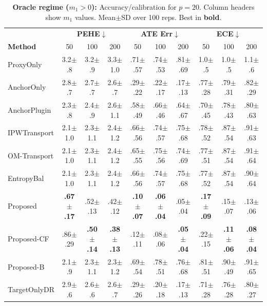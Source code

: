 \begin{table}[t]
\centering
\tiny
\setlength{\tabcolsep}{2pt}
\renewcommand{\arraystretch}{1.1}
\begin{tabular}{@{}l|ccc|ccc|ccc@{}}
\hline
& \multicolumn{3}{c|}{\textbf{PEHE}$\downarrow$} & \multicolumn{3}{c|}{\textbf{ATE Err}$\downarrow$} & \multicolumn{3}{c}{\textbf{ECE}$\downarrow$} \\
\textbf{Method} & 50 & 100 & 200 & 50 & 100 & 200 & 50 & 100 & 200 \\
\hline
ProxyOnly & 3.2{\tiny$\pm$.8} & 3.2{\tiny$\pm$.9} & 3.3{\tiny$\pm$1.0} & .71{\tiny$\pm$.57} & .74{\tiny$\pm$.53} & .81{\tiny$\pm$.69} & 1.0{\tiny$\pm$.5} & 1.0{\tiny$\pm$.5} & 1.1{\tiny$\pm$.6} \\
AnchorOnly & 2.8{\tiny$\pm$.7} & 2.7{\tiny$\pm$.7} & 2.6{\tiny$\pm$.7} & .29{\tiny$\pm$.22} & .22{\tiny$\pm$.17} & .17{\tiny$\pm$.13} & .77{\tiny$\pm$.28} & .79{\tiny$\pm$.31} & .82{\tiny$\pm$.29} \\
AnchorPlugin & 2.3{\tiny$\pm$.8} & 2.4{\tiny$\pm$.9} & 2.6{\tiny$\pm$1.1} & .58{\tiny$\pm$.49} & .66{\tiny$\pm$.46} & .64{\tiny$\pm$.67} & .70{\tiny$\pm$.45} & .78{\tiny$\pm$.43} & .80{\tiny$\pm$.63} \\
IPWTransport & 2.1{\tiny$\pm$1.0} & 2.3{\tiny$\pm$1.1} & 2.4{\tiny$\pm$1.2} & .66{\tiny$\pm$.56} & .74{\tiny$\pm$.57} & .75{\tiny$\pm$.68} & .78{\tiny$\pm$.52} & .87{\tiny$\pm$.54} & .91{\tiny$\pm$.63} \\
OM-Transport & 2.1{\tiny$\pm$1.0} & 2.3{\tiny$\pm$1.1} & 2.4{\tiny$\pm$1.2} & .65{\tiny$\pm$.55} & .75{\tiny$\pm$.56} & .74{\tiny$\pm$.69} & .77{\tiny$\pm$.51} & .87{\tiny$\pm$.54} & .91{\tiny$\pm$.64} \\
EntropyBal & 2.1{\tiny$\pm$1.0} & 2.3{\tiny$\pm$1.1} & 2.4{\tiny$\pm$1.2} & .66{\tiny$\pm$.56} & .74{\tiny$\pm$.57} & .75{\tiny$\pm$.68} & .77{\tiny$\pm$.52} & .87{\tiny$\pm$.54} & .90{\tiny$\pm$.64} \\
Proposed & \textbf{.67{\tiny$\pm$.17}} & .52{\tiny$\pm$.13} & .42{\tiny$\pm$.12} & \textbf{.10{\tiny$\pm$.07}} & \textbf{.06{\tiny$\pm$.04}} & .05{\tiny$\pm$.04} & \textbf{.17{\tiny$\pm$.09}} & .15{\tiny$\pm$.07} & .13{\tiny$\pm$.06} \\
Proposed-CF & .86{\tiny$\pm$.29} & \textbf{.50{\tiny$\pm$.14}} & \textbf{.38{\tiny$\pm$.13}} & .12{\tiny$\pm$.11} & .08{\tiny$\pm$.06} & \textbf{.05{\tiny$\pm$.04}} & .22{\tiny$\pm$.15} & \textbf{.11{\tiny$\pm$.06}} & \textbf{.08{\tiny$\pm$.04}} \\
Proposed-B & 2.1{\tiny$\pm$.9} & 2.3{\tiny$\pm$1.1} & 2.3{\tiny$\pm$1.2} & .69{\tiny$\pm$.54} & .78{\tiny$\pm$.51} & .76{\tiny$\pm$.68} & .81{\tiny$\pm$.51} & .90{\tiny$\pm$.49} & .91{\tiny$\pm$.65} \\
TargetOnlyDR & 2.9{\tiny$\pm$.6} & 2.6{\tiny$\pm$.6} & 2.6{\tiny$\pm$.7} & .29{\tiny$\pm$.26} & .20{\tiny$\pm$.18} & .17{\tiny$\pm$.13} & .71{\tiny$\pm$.28} & .76{\tiny$\pm$.28} & .80{\tiny$\pm$.27} \\
\hline
\end{tabular}
\caption{
\textbf{Oracle regime ($m_1>0$):} Accuracy/calibration for $p=20$. Column headers show $m_1$ values.
Mean{\tiny$\pm$SD} over 100 reps. Best in \textbf{bold}.
}
\label{tab:oracle-m050-acc}
\end{table}
